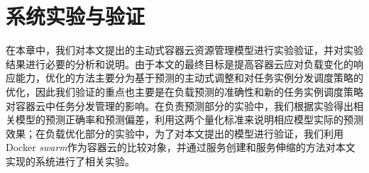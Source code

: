 
\chapter{系统实验与验证}\label{chap:sys_eval}
在本章中，我们对本文提出的主动式容器云资源管理模型进行实验验证，并对实验结果进行必要的分析和说明。由于本文的最终目标是提高容器云应对负载变化的响应能力，优化的方法主要分为基于预测的主动式调整和对任务实例分发调度策略的优化，因此我们验证的重点也主要是在负载预测的准确性和新的任务实例调度策略对容器云中任务分发管理的影响。在负责预测部分的实验中，我们根据实验得出相关模型的预测正确率和预测偏差，利用这两个量化标准来说明相应模型实际的预测效果；在负载优化部分的实验中，为了对本文提出的模型进行验证，我们利用Docker \emph{swarm}作为容器云的比较对象，并通过服务创建和服务伸缩的方法对本文实现的系统进行了相关实验。

